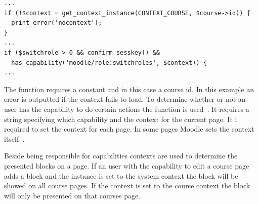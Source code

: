 \begin{lstlisting}[style=phpCode, caption=\myCaption{A snippet from \moodlefile{/course/view.php}}, label=courseviewcontextsnippet]
...
if (!$context = get_context_instance(CONTEXT_COURSE, $course->id)) {
  print_error('nocontext');
}
...
if ($switchrole > 0 && confirm_sesskey() &&
  has_capability('moodle/role:switchroles', $context)) {
...	
\end{lstlisting}
The function  requires a constant and in this case a course id. 
In this example an error is outputted if the context fails to load. 
To determine whether or not an user has the capability to do certain actions the function  is used~\cite{moodlerolesandmodules}. It requires a string specifying which capability and the context for the current page. 
It i required to set the context for each page. 
In some pages Moodle sets the context itself~\cite{moodlepageapi}. 

Beside being responsible for capabilities contexts are used to determine the presented blocks on a page. If an user with the capability to edit a course page adds a block and the instance is set to the system context the block will be showed on all course pages. If the context is set to the course context the block will only be presented on that courses page. 

	
	
	